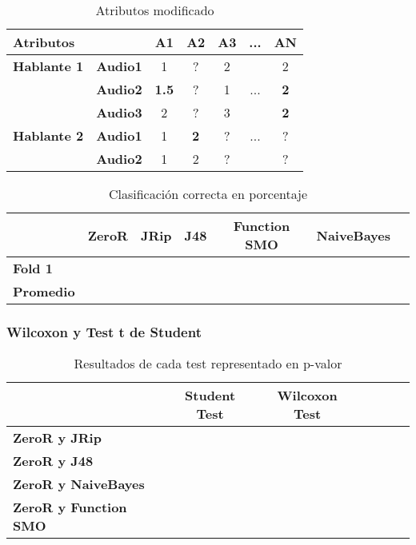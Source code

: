 \begin{table}[H]
	\centering
	\begin{tabular}{|l|l|ccccc|}
		\hline
		\multicolumn{2}{|l|}{Atributos} & A1 & A2 & A3 & ... & AN \\
		\hline 
		\textbf{Hablante 1} & \textbf{Audio1} & 1 & ? & 2 & & 2\\
		& \textbf{Audio2} & \textbf{1.5} & ? & 1 & ... & \textbf{2} \\
		& \textbf{Audio3} & 2 & ? & 3 & & \textbf{2} \\
		\hline
		\textbf{Hablante 2} & \textbf{Audio1} & 1 & \textbf{2} & ? & ... & ? \\
		& \textbf{Audio2} & 1 & 2 & ? & & ? \\
		\hline
	\end{tabular}
	\caption{Atributos modificado}
	\label{attr_mod}
\end{table}

\begin{table}[H]
	\centering
	\begin{tabular}{|l|c|c|c|c|c|c|}
		\hline
		\textbf{}  & \textbf{ZeroR} & \textbf{JRip} & \textbf{J48} & \textbf{Function SMO} & \textbf{NaiveBayes} \\ \hline
		\textbf{Fold 1}  &  &  &  &  &  \\ \hline
		\hline \hline
		\textbf{Promedio} &  &  &  &  &  \\ \hline
	\end{tabular}
	\caption{Clasificación correcta en porcentaje}
	\label{class_corr_en_pct}
\end{table}

\subsubsection{Wilcoxon y Test t de Student}

\begin{table}[H]
	\centering
	\begin{tabular}{|l|c|c|c|c|c|c|}
		\hline
		\textbf{}  & \textbf{Student Test} & \textbf{Wilcoxon Test} \\ \hline
		\textbf{ZeroR y JRip}  &  &  \\ \hline
		\textbf{ZeroR y J48}  &  &  \\ \hline
		\textbf{ZeroR y NaiveBayes}  &  &  \\ \hline
		\textbf{ZeroR y Function SMO}  &  & \\ \hline
	\end{tabular}
	\caption{Resultados de cada test representado en p-valor}
	\label{res_tests_wilcoxon_student}
\end{table}


